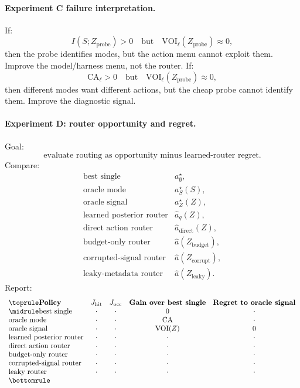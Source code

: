 \documentclass{article}
\begin{document}
\paragraph{Experiment C failure interpretation.}
If:
\[
    I(S;Z_{\mathrm{probe}})>0
    \quad\text{but}\quad
    \mathrm{VOI}_{\ell}(Z_{\mathrm{probe}})\approx 0,
\]
then the probe identifies modes, but the action menu cannot exploit them.
Improve the model/harness menu, not the router.
If:
\[
    \mathrm{CA}_{\ell}>0
    \quad\text{but}\quad
    \mathrm{VOI}_{\ell}(Z_{\mathrm{probe}})\approx 0,
\]
then different modes want different actions, but the cheap probe cannot identify them.
Improve the diagnostic signal.

\paragraph{Experiment D: router opportunity and regret.}
Goal:
\[
    \text{evaluate routing as opportunity minus learned-router regret.}
\]
Compare:
\[
\begin{array}{ll}
    \text{best single} & a^\star_{\emptyset},\\
    \text{oracle mode} & a^\star_S(S),\\
    \text{oracle signal} & a^\star_Z(Z),\\
    \text{learned posterior router} & \hat a_q(Z),\\
    \text{direct action router} & \hat a_{\mathrm{direct}}(Z),\\
    \text{budget-only router} & \hat a(Z_{\mathrm{budget}}),\\
    \text{corrupted-signal router} & \hat a(Z_{\mathrm{corrupt}}),\\
    \text{leaky-metadata router} & \hat a(Z_{\mathrm{leaky}}).
\end{array}
\]
Report:
\[
\begin{array}{lcccc}
\toprule
\textbf{Policy} &
J_{\mathrm{hit}} &
J_{\mathrm{occ}} &
\textbf{Gain over best single} &
\textbf{Regret to oracle signal}\\
\midrule
\text{best single} & \cdot & \cdot & 0 & \cdot\\
\text{oracle mode} & \cdot & \cdot & \mathrm{CA} & \cdot\\
\text{oracle signal} & \cdot & \cdot & \mathrm{VOI}(Z) & 0\\
\text{learned posterior router} & \cdot & \cdot & \cdot & \cdot\\
\text{direct action router} & \cdot & \cdot & \cdot & \cdot\\
\text{budget-only router} & \cdot & \cdot & \cdot & \cdot\\
\text{corrupted-signal router} & \cdot & \cdot & \cdot & \cdot\\
\text{leaky router} & \cdot & \cdot & \cdot & \cdot\\
\bottomrule
\end{array}
\]
\end{document}
